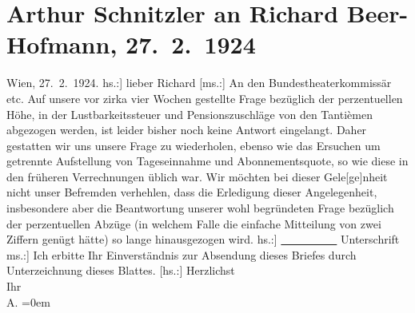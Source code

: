 

         
         \renewcommand{\erwaehntePersonen}{Personen: Richard Beer-Hofmann, Albert Renkin}
         \renewcommand{\erwaehnteOrte}{Orte: Wien}
         \renewcommand{\erwaehnteWerke}{}
               \section[Arthur Schnitzler an Richard Beer-Hofmann, 27. 2. 1924]{ Arthur Schnitzler an Richard Beer-Hofmann, 27. 2. 1924}\nopagebreak{}\rehead{ }\begin{ledgroupsized}[t]{13cm}\normalsize\beginnumbering \toendnotes[C]{\smallbreak\pagebreak[2]} 
\toendnotes[C]{\smallbreak}\pstart
           \raggedleft{}{\pb}Wien, 27. 2. 1924.\pend
           \pstart\center{}{[}hs.:{]} lieber Richard\pend\pstart
           {[}ms.:{]} An den Bundestheaterkommissär etc.\pend
           \pstart
           Auf unsere vor zirka vier Wochen gestellte Frage bezüglich der perzentuellen Höhe, in
               der Lustbarkeitssteuer und Pensionszuschläge von den Tantièmen abgezogen werden, ist
               leider bisher noch keine Antwort eingelangt. Daher gestatten wir uns unsere Frage zu
               wiederholen, ebenso wie das Ersuchen um getrennte Aufstellung von Tageseinnahme und
               Abonnementsquote, so wie diese in den früheren Verrechnungen üblich war. Wir möchten
               bei dieser Gele{[}ge{]}nheit nicht unser Befremden verhehlen, dass die
               Erledigung dieser Angelegenheit, insbesondere aber die Beantwortung unserer wohl
               begründeten Frage bezüglich der perzentuellen Abzüge
               (in welchem Falle die einfache Mitteilung von zwei Ziffern genügt hätte) so lange
               hinausgezogen wird.\pend
           \pstart
           \raggedleft{}{[}hs.:{]} \uline{          } Unterschrift\pend
           \pstart
           \noindent{}{[}ms.:{]} Ich erbitte Ihr Einverständnis zur Absendung dieses
               Briefes durch Unterzeichnung dieses Blattes.\pend
           \pstart
           {[}hs.:{]} Herzlichst{\\[\baselineskip]}Ihr{\\[\baselineskip]}\spacefill\mbox{A.}\pend
           \leftskip=0em{}
         
         \endnumbering{}\end{ledgroupsized}  \newcommand{\dateiname}{L02410}\newcommand{\titel}{Arthur Schnitzler an Richard Beer-Hofmann, 27. 2. 1924}\newcommand{\editorInnen}{Martin Anton Müller und Gerd-Hermann Susen}
      
